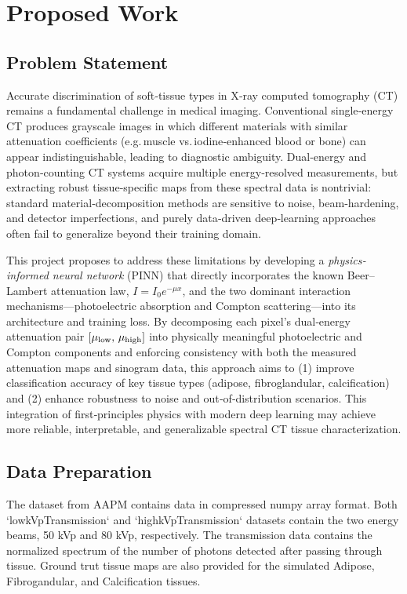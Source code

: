 \section{Proposed Work}\label{sec:proposed_work}

\subsection{Problem Statement}\label{subsec:problem_Statement}

Accurate discrimination of soft‐tissue types in X‐ray computed tomography (CT) remains a
fundamental challenge in medical imaging. Conventional single‐energy CT produces grayscale
images in which different materials with similar attenuation coefficients (e.g.\,muscle 
vs.\,iodine‐enhanced blood or bone) can appear indistinguishable, leading to diagnostic 
ambiguity. Dual‐energy and photon‐counting CT systems acquire multiple energy‐resolved 
measurements, but extracting robust tissue‐specific maps from these spectral data is 
nontrivial: standard material‐decomposition methods are sensitive to noise, beam‐hardening, 
and detector imperfections, and purely data‐driven deep‐learning approaches often fail to 
generalize beyond their training domain.

This project proposes to address these limitations by developing a \emph{physics‐informed neural network} 
(PINN) that directly incorporates the known Beer–Lambert attenuation law, $I = I_0 e^{-\mu x}$, and the
two dominant interaction mechanisms—photoelectric absorption and Compton scattering—into its architecture 
and training loss. By decomposing each pixel’s dual‐energy attenuation pair \([\mu_{\rm low},\,
\mu_{\rm high}]\) into physically meaningful photoelectric and Compton components and enforcing 
consistency with both the measured attenuation maps and sinogram data, this approach aims to (1)
improve classification accuracy of key tissue types (adipose, fibroglandular, calcification) and (2) 
enhance robustness to noise and out‐of‐distribution scenarios. This integration of first‐principles 
physics with modern deep learning may achieve more reliable, interpretable, and generalizable 
spectral CT tissue characterization.

\subsection{Data Preparation}\label{sec:data_preparation}

The dataset from AAPM \cite{AAPM2024SpectralCT} contains data in compressed numpy array format. Both
`lowkVpTransmission` and `highkVpTransmission` datasets contain the two energy beams, 50 kVp and 80
kVp, respectively. The transmission data contains the normalized spectrum of the number of photons
detected after passing through tissue. Ground trut tissue maps are also provided for the simulated
Adipose, Fibrogandular, and Calcification tissues.

